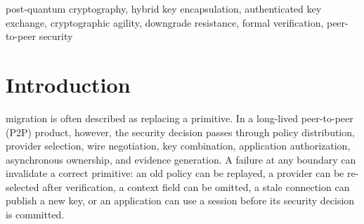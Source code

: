 \documentclass[journal]{IEEEtran}
\newcommand{\system}{\textsc{BoundSession}}
\begin{document}
\maketitle

\begin{abstract}
Post-quantum migration in long-lived peer-to-peer applications crosses signed
policy, hybrid key establishment, authenticated handshake, asynchronous session
ownership, and business-effect authorization. Existing work typically verifies
only a subset of this chain. We propose
\emph{policy-to-purpose-to-byte continuity}: each endpoint accepts an
application effect only if its local authenticated decision authorizes the same
peer-visible policy, purpose, wire cryptographic profile, context, and transcript
as the matching peer run; its exact local owner transaction has committed; and a
purpose-specific effect receipt verifies. \system{} is designed to bind the
purpose and policy projection into context-bound PQ/T key establishment, confirm
the complete transcript, derive purpose-separated channel keys, and require
bilateral authorization readiness before business data reaches a trusted effect
committer. We also define a layered assurance boundary that keeps
computational combiner binding, symbolic protocol analysis, state-machine
checking, implementation conformance, final-binary evidence, and physical-device
measurements distinct. This manuscript is an independent design-stage draft:
the integrated proofs, final-source implementation, and cross-platform
application experiments are deliberately reported as pending rather than
inferred from component artifacts.
\end{abstract}

\begin{IEEEkeywords}
post-quantum cryptography, hybrid key encapsulation, authenticated key exchange,
cryptographic agility, downgrade resistance, formal verification, peer-to-peer
security
\end{IEEEkeywords}

\section{Introduction}
 migration is often described as replacing a
primitive. In a long-lived peer-to-peer (P2P) product, however, the security
decision passes through policy distribution, provider selection, wire
negotiation, key combination, application authorization, asynchronous ownership,
and evidence generation. A failure at any boundary can invalidate a correct
primitive: an old policy can be replayed, a provider can be re-selected after
verification, a context field can be omitted, a stale connection can publish a
new key, or an application can use a session before its security decision is
committed.
\end{document}
